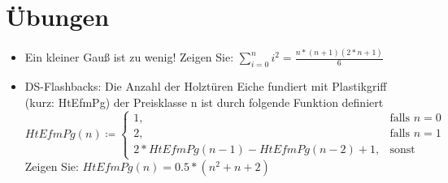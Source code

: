 \documentclass[hidelinks]{article}
\theoremstyle{plain}
\theoremstyle{definition}
\theoremstyle{rem}
\begin{document}
\begin{sloppypar}
\section{Übungen}
\begin{itemize}
\item Ein kleiner Gauß ist zu wenig! Zeigen Sie: $\sum_{i=0}^{n}i^2=\frac{n*(n+1)(2*n+1)}{6}$
\item DS-Flashbacks: Die Anzahl der Holztüren Eiche fundiert mit Plastikgriff (kurz: HtEfmPg) der Preisklasse n ist durch folgende Funktion definiert
\begin{equation}
HtEfmPg(n)\coloneqq\begin{cases}
		1, & \text{falls $n=0$}\\
		2, & \text{falls $n=1$}\\
	   	2*HtEfmPg(n-1)-HtEfmPg(n-2)+1, & \text{sonst}
	\end{cases}
\end{equation}
Zeigen Sie: $HtEfmPg(n)=0.5*(n^2+n+2)$
\end{itemize}
\end{sloppypar}
\end{document}

